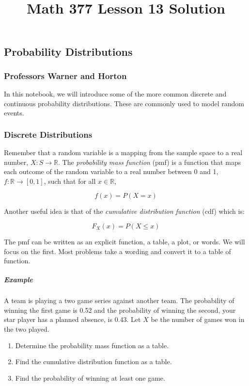 \documentclass[11pt]{article}
\title{Math 377 Lesson 13 Solution}
\providecommand{\tightlist}{%
      \setlength{\itemsep}{0pt}\setlength{\parskip}{0pt}}
\begin{document}
    
    
    \maketitle
    
    

    
    \subsection{Probability Distributions}\label{probability-distributions}

\subsubsection{Professors Warner and
Horton}\label{professors-warner-and-horton}

In this notebook, we will introduce some of the more common discrete and
continuous probability distributions. These are commonly used to model
random events.

    \subsubsection{Discrete Distributions}\label{discrete-distributions}

    Remember that a random variable is a mapping from the sample space to a
real number, \(X:S \rightarrow \mathbb{R}\). The \emph{probability mass
function} (pmf) is a function that maps each outcome of the random
variable to a real number between 0 and 1,
\(f: \mathbb{R} \rightarrow [0,1]\), such that for all
\(x \in \mathbb{R}\),

\[f(x)=P(X=x)\]

    Another useful idea is that of the \emph{cumulative distribution
function} (cdf) which is:

\[ F_{X}(x) = P(X \leq x)\]

    The pmf can be written as an explicit function, a table, a plot, or
words. We will focus on the first. Most problems take a wording and
convert it to a table of function.

    \subparagraph{Example}\label{example}

A team is playing a two game series against another team. The
probability of winning the first game is 0.52 and the probability of
winning the second, your star player has a planned absence, is 0.43. Let
\(X\) be the number of games won in the two played.

\begin{enumerate}
\def\labelenumi{\arabic{enumi})}
\tightlist
\item
  Determine the probability mass function as a table.\\
\item
  Find the cumulative distribution function as a table.\\
\item
  Find the probability of winning at least one game.
\end{enumerate}
\end{document}

